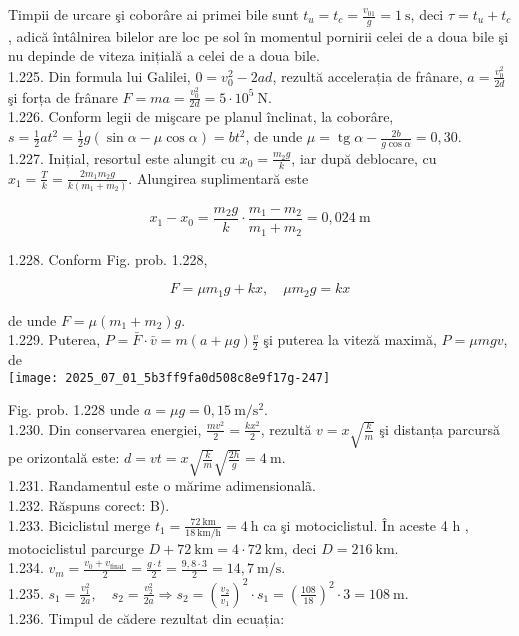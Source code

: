 Timpii de urcare şi coborâre ai primei bile sunt $t_{u}=t_{c}=\frac{v_{01}}{g}=1 \mathrm{~s}$, deci $\tau=t_{u}+t_{c}$, adică întâlnirea bilelor are loc pe sol în momentul pornirii celei de a doua bile şi nu depinde de viteza inițială a celei de a doua bile.\\
1.225. Din formula lui Galilei, $0=v_{0}^{2}-2 a d$, rezultă accelerația de frânare, $a=\frac{v_{0}^{2}}{2 d}$ şi forța de frânare $F=m a=\frac{v_{0}^{2}}{2 d}=5 \cdot 10^{5} \mathrm{~N}$.\\
1.226. Conform legii de mişcare pe planul înclinat, la coborâre, $s=\frac{1}{2} a t^{2}=\frac{1}{2} g(\sin \alpha-\mu \cos \alpha)=b t^{2}$, de unde $\mu=\operatorname{tg} \alpha-\frac{2 b}{g \cos \alpha}=0,30$.\\
1.227. Inițial, resortul este alungit cu $x_{0}=\frac{m_{2} g}{k}$, iar după deblocare, cu $x_{1}=\frac{T}{k}=\frac{2 m_{1} m_{2} g}{k\left(m_{1}+m_{2}\right)}$. Alungirea suplimentară este

$$
x_{1}-x_{0}=\frac{m_{2} g}{k} \cdot \frac{m_{1}-m_{2}}{m_{1}+m_{2}}=0,024 \mathrm{~m}
$$

1.228. Conform Fig. prob. 1.228,

$$
F=\mu m_{1} g+k x, \quad \mu m_{2} g=k x
$$

de unde $F=\mu\left(m_{1}+m_{2}\right) g$.\\
1.229. Puterea, $P=\bar{F} \cdot \bar{v}=m(a+\mu g) \frac{v}{2}$ şi puterea la viteză maximă, $P=\mu m g v$, de\\
\texttt{[image: 2025\_07\_01\_5b3ff9fa0d508c8e9f17g-247]}

Fig. prob. 1.228 unde $a=\mu g=0,15 \mathrm{~m} / \mathrm{s}^{2}$.\\
1.230. Din conservarea energiei, $\frac{m v^{2}}{2}=\frac{k x^{2}}{2}$, rezultă $v=x \sqrt{\frac{k}{m}}$ şi distanța parcursă pe orizontală este: $d=v t=x \sqrt{\frac{k}{m}} \sqrt{\frac{2 h}{g}}=4 \mathrm{~m}$.\\
1.231. Randamentul este o mărime adimensionalã.\\
1.232. Răspuns corect: B).\\
1.233. Biciclistul merge $t_{1}=\frac{72 \mathrm{~km}}{18 \mathrm{~km} / \mathrm{h}}=4 \mathrm{~h}$ ca şi motociclistul. În aceste 4 h , motociclistul parcurge $D+72 \mathrm{~km}=4 \cdot 72 \mathrm{~km}$, deci $D=216 \mathrm{~km}$.\\
1.234. $v_{m}=\frac{v_{0}+v_{\text {final }}}{2}=\frac{g \cdot t}{2}=\frac{9,8 \cdot 3}{2}=14,7 \mathrm{~m} / \mathrm{s}$.\\
1.235. $s_{1}=\frac{v_{1}^{2}}{2 a}, \quad s_{2}=\frac{v_{2}^{2}}{2 a} \Rightarrow s_{2}=\left(\frac{v_{2}}{v_{1}}\right)^{2} \cdot s_{1}=\left(\frac{108}{18}\right)^{2} \cdot 3=108 \mathrm{~m}$.\\
1.236. Timpul de cădere rezultat din ecuația:

